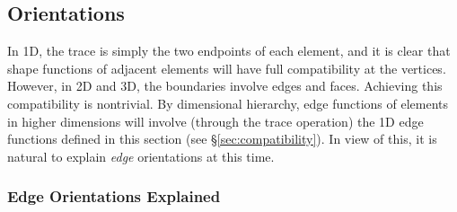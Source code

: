 \subsection{Orientations}
\label{sec:fulledgeorientations}
In 1D, the trace is simply the two endpoints of each element, and it is clear that shape functions of adjacent elements will have full compatibility at the vertices. %
However, in 2D and 3D, the boundaries involve edges and faces.
Achieving this compatibility is nontrivial.
By dimensional hierarchy, edge functions of elements in higher dimensions will involve (through the trace operation) the 1D edge functions defined in this section (see \S\ref{sec:compatibility}).
In view of this, it is natural to explain \textit{edge} orientations at this time.


\subsubsection{Edge Orientations Explained}
\label{sec:edgeorientations}

